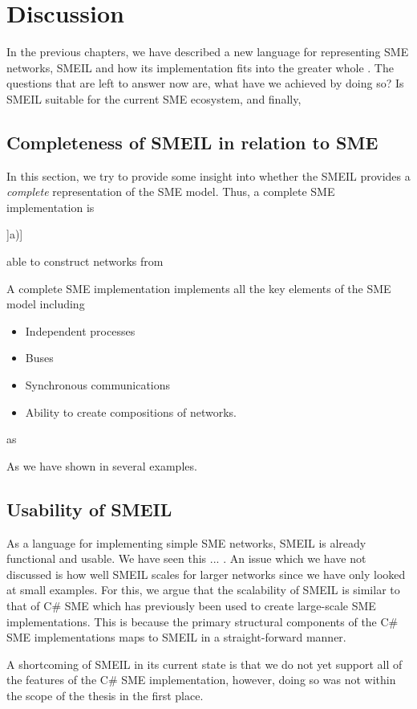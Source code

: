 \chapter{Discussion}

In the previous chapters, we have described a new language for representing SME
networks, SMEIL and how its implementation fits into the greater whole
. The questions that are left to answer now are, what have we
achieved by doing so? Is SMEIL suitable for the current SME ecosystem, and
finally,

\section{Completeness of SMEIL in relation to SME}
In this section, we try to provide some insight into whether the SMEIL provides
a {\itshape complete} representation of the SME model. Thus, a complete SME
implementation is \begin{inparaenum}]a)] \item able to construct networks from 
\end{inparaenum}

A complete SME implementation implements all the key elements of the SME model
including
\begin{itemize}
\item Independent processes
\item Buses
\item Synchronous communications
\item Ability to create compositions of networks.
\end{itemize}
as

As we have shown in several examples. 

\section{Usability of SMEIL}
As a language for implementing simple SME networks, SMEIL is already functional
and usable. We have seen this ... . An issue which we have not discussed is how
well SMEIL scales for larger networks since we have only looked at small
examples. For this, we argue that the scalability of SMEIL is similar to that of
C\# SME which has previously been used to create large-scale SME
implementations. This is because the primary structural components of the C\#
SME implementations maps to SMEIL in a straight-forward manner.

A shortcoming of SMEIL in its current state is that we do not yet support all of
the features of the C\# SME implementation, however, doing so was not within the
scope of the thesis in the first place.

